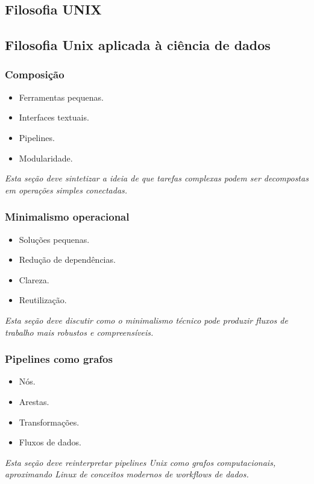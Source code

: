 \documentclass[12pt,openany]{book}
\newcommand{\placeholder}[1]{
    \par\medskip
    \noindent\textit{#1}
    \par\medskip
}
\newcommand{\topicos}[1]{
    \begin{itemize}
        #1
    \end{itemize}
}
\begin{document}
\begin{refsection}
\part{Filosofia UNIX}

\chapter{Filosofia Unix aplicada à ciência de dados}

\section{Composição}

\topicos{
    \item Ferramentas pequenas.
    \item Interfaces textuais.
    \item Pipelines.
    \item Modularidade.
}

\placeholder{Esta seção deve sintetizar a ideia de que tarefas complexas podem ser decompostas em operações simples conectadas.}

\section{Minimalismo operacional}

\topicos{
    \item Soluções pequenas.
    \item Redução de dependências.
    \item Clareza.
    \item Reutilização.
}

\placeholder{Esta seção deve discutir como o minimalismo técnico pode produzir fluxos de trabalho mais robustos e compreensíveis.}

\section{Pipelines como grafos}

\topicos{
    \item Nós.
    \item Arestas.
    \item Transformações.
    \item Fluxos de dados.
}

\placeholder{Esta seção deve reinterpretar pipelines Unix como grafos computacionais, aproximando Linux de conceitos modernos de workflows de dados.}


\end{refsection}
\end{document}
